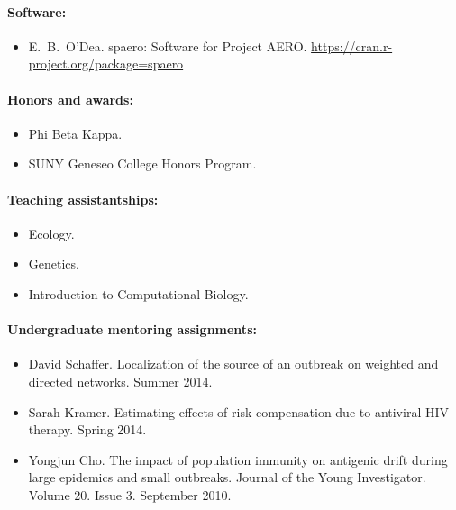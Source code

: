 \documentclass[a4paper]{article}
\begin{document}
\paragraph{Software:}
\begin{itemize}
  \item[~] E.\ B.\ O'Dea. spaero: Software for Project
    AERO. \url{https://cran.r-project.org/package=spaero}
\end{itemize}

\paragraph{Honors and awards:}
\begin{itemize}
  \item[~] Phi Beta Kappa.
  \item[~] SUNY Geneseo College Honors Program.
\end{itemize}

\paragraph{Teaching assistantships:}

\begin{itemize}
  \item[~] Ecology.
  \item[~] Genetics.
  \item[~] Introduction to Computational Biology.
\end{itemize}

\paragraph{Undergraduate mentoring assignments:}

\begin{itemize}
  \item[~] David Schaffer. Localization of the source of an outbreak
    on weighted and directed networks. Summer 2014.
  \item[~] Sarah Kramer. Estimating effects of risk compensation due
    to antiviral HIV therapy. Spring 2014.
  \item[~] Yongjun Cho. The impact of population immunity on antigenic
    drift during large epidemics and small outbreaks. Journal of the
    Young Investigator. Volume 20. Issue 3. September 2010.
\end{itemize}
\end{document}
